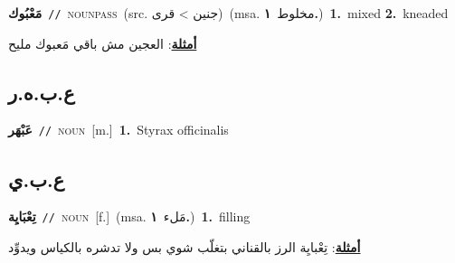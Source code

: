 \documentclass[10pt,a4paper,twoside]{article} %
\begin{document}
\begin{multicols}{2}
{\setlength\topsep{0pt}\textbf{\foreignlanguage{arabic}{مَعْبُوك}}\ {\color{gray}\texttt{//}\color{black}}\ \textsc{noun\textunderscore pass}\ (src. \color{gray}\foreignlanguage{arabic}{جنين > قرى}\color{black})\ \color{gray}(msa. \foreignlanguage{arabic}{مخلوط}~\foreignlanguage{arabic}{\textbf{١.}})\color{black}\ \textbf{1.}~mixed  \textbf{2.}~kneaded\  \begin{flushright}\color{gray}\foreignlanguage{arabic}{\textbf{\underline{\foreignlanguage{arabic}{أمثلة}}}: العجين مش باقي مَعبوك مليح}\end{flushright}\color{black}} \vspace{2mm}

\vspace{-3mm}
\subsection*{\color{blue}\foreignlanguage{arabic}{ع.ب.ه.ر}\color{blue}{ (ntws)}} 

{\setlength\topsep{0pt}\textbf{\foreignlanguage{arabic}{عَبْهَر}}\ {\color{gray}\texttt{//}\color{black}}\ \textsc{noun}\ [m.]\ \textbf{1.}~Styrax officinalis\ } \vspace{2mm}

\vspace{-3mm}
\subsection*{\color{blue}\foreignlanguage{arabic}{ع.ب.ي}\color{blue}{}} 

{\setlength\topsep{0pt}\textbf{\foreignlanguage{arabic}{تِعْبَايِة}}\ {\color{gray}\texttt{//}\color{black}}\ \textsc{noun}\ [f.]\ \color{gray}(msa. \foreignlanguage{arabic}{مَلء}~\foreignlanguage{arabic}{\textbf{١.}})\color{black}\ \textbf{1.}~filling\  \begin{flushright}\color{gray}\foreignlanguage{arabic}{\textbf{\underline{\foreignlanguage{arabic}{أمثلة}}}: تِعْبايِة الرز بالقناني بتغلّب شوي بس ولا تدشره بالكياس ويدوِّد}\end{flushright}\color{black}} \vspace{2mm}


\end{multicols}
\end{document}
